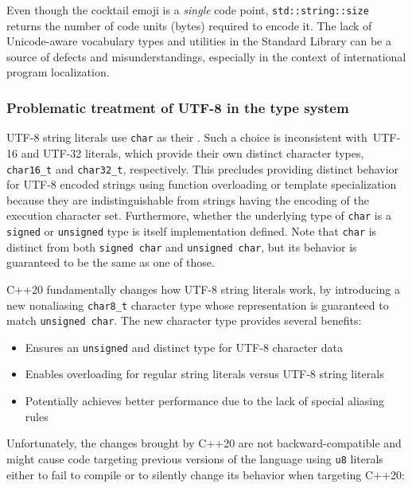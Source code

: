 \noindent Even though the cocktail emoji is a \emph{single} code point,
\lstinline!std::string::size! returns the number of code units (bytes) required to
encode it. The lack of Unicode-aware vocabulary types and utilities in
the Standard Library can be a source of defects and misunderstandings,
especially in the context of international program localization.

\subsubsection[Problematic treatment of UTF-8 in the type system]{Problematic treatment of UTF-8 in the type system}\label{utf-8-quirks}

UTF-8 string literals use \lstinline!char! as their . Such a
choice is inconsistent with~UTF-16 and UTF-32 literals, which provide
their own distinct character types, \lstinline!char16_t! and
\lstinline!char32_t!, respectively. This precludes providing distinct behavior for UTF-8 encoded strings using function overloading or template specialization because they are indistinguishable from strings having the encoding of the execution character set. Furthermore, whether the underlying
type of \lstinline!char! is a \lstinline!signed! or \lstinline!unsigned! type is
itself implementation defined. Note that
\lstinline!char! is distinct from both \lstinline!signed!~\lstinline!char! and
\lstinline!unsigned!~\lstinline!char!, but its behavior is guaranteed to be
  the same as one of those.
  
C++20
fundamentally changes how UTF-8 string literals work, by introducing a
new non\-ali\-as\-ing \lstinline!char8_t! character type whose representation
is guaranteed to match \lstinline!unsigned!~\lstinline!char!. The new
character type provides several benefits:
\begin{itemize}
\item{Ensures an \lstinline!unsigned! and distinct type for UTF-8 character data}
\item{Enables overloading for regular string literals versus UTF-8 string literals}
\item{Potentially achieves better performance due to the lack of special aliasing rules}
\end{itemize}
Unfortunately, the changes brought by C++20 are not
backward-compatible and might cause code targeting previous versions
of the language using \lstinline!u8! literals either to fail to compile
or to silently change its behavior when targeting C++20:

